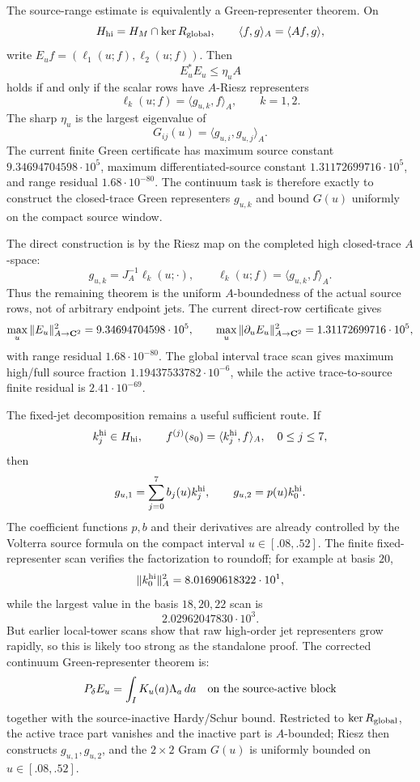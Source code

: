 \documentclass[11pt]{article}
\begin{document}
The source-range estimate is equivalently a Green-representer theorem.  On
\[
  H_{\rm hi}=H_M\cap\ker R_{\rm global},\qquad
  \langle f,g\rangle_A=\langle Af,g\rangle,
\]
write \(E_u f=(\ell_1(u;f),\ell_2(u;f))\).  Then
\[
  E_u^\ast E_u\le\eta_u A
\]
holds if and only if the scalar rows have \(A\)-Riesz representers
\[
  \ell_k(u;f)=\langle g_{u,k},f\rangle_A,\qquad k=1,2.
\]
The sharp \(\eta_u\) is the largest eigenvalue of
\[
  G_{ij}(u)=\langle g_{u,i},g_{u,j}\rangle_A .
\]
The current finite Green certificate has maximum source constant
\(9.34694704598\cdot10^5\), maximum differentiated-source constant
\(1.31172699716\cdot10^5\), and range residual
\(1.68\cdot10^{-80}\).  The continuum task is therefore exactly to construct
the closed-trace Green representers \(g_{u,k}\) and bound \(G(u)\) uniformly on
the compact source window.

The direct construction is by the Riesz map on the completed high closed-trace
\(A\)-space:
\[
  g_{u,k}=J_A^{-1}\ell_k(u;\cdot),
  \qquad
  \ell_k(u;f)=\langle g_{u,k},f\rangle_A .
\]
Thus the remaining theorem is the uniform \(A\)-boundedness of the actual
source rows, not of arbitrary endpoint jets.  The current direct-row
certificate gives
\[
  \max_u\|E_u\|_{A\to{\bf C}^2}^2=9.34694704598\cdot10^5,
  \qquad
  \max_u\|\partial_uE_u\|_{A\to{\bf C}^2}^2=1.31172699716\cdot10^5,
\]
with range residual \(1.68\cdot10^{-80}\).  The global interval trace scan
gives maximum high/full source fraction \(1.19437533782\cdot10^{-6}\), while
the active trace-to-source finite residual is \(2.41\cdot10^{-69}\).

The fixed-jet decomposition remains a useful sufficient route.  If
\[
  k_j^{\rm hi}\in H_{\rm hi},\qquad
  f^{(j)}(s_0)=\langle k_j^{\rm hi},f\rangle_A,\quad 0\le j\le7,
\]
then
\[
  g_{u,1}=\sum_{j=0}^7 b_j(u)k_j^{\rm hi},\qquad
  g_{u,2}=p(u)k_0^{\rm hi}.
\]
The coefficient functions \(p,b\) and their derivatives are already controlled
by the Volterra source formula on the compact interval \(u\in[.08,.52]\).
The finite fixed-representer scan verifies the factorization to roundoff; for
example at basis \(20\),
\[
  \|k_0^{\rm hi}\|_A^2=8.01690618322\cdot10^1,
\]
while the largest value in the basis \(18,20,22\) scan is
\[
  2.02962047830\cdot10^3.
\]
But earlier local-tower scans show that raw high-order jet representers grow
rapidly, so this is likely too strong as the standalone proof.  The corrected
continuum Green-representer theorem is:
\[
  P_\delta E_u=\int_I K_u(a)\Lambda_a\,da
  \quad\hbox{on the source-active block}
\]
together with the source-inactive Hardy/Schur bound.  Restricted to
\(\ker R_{\rm global}\), the active trace part vanishes and the inactive part
is \(A\)-bounded; Riesz then constructs \(g_{u,1},g_{u,2}\), and the
\(2\times2\) Gram \(G(u)\) is uniformly bounded on \(u\in[.08,.52]\).
\end{document}
